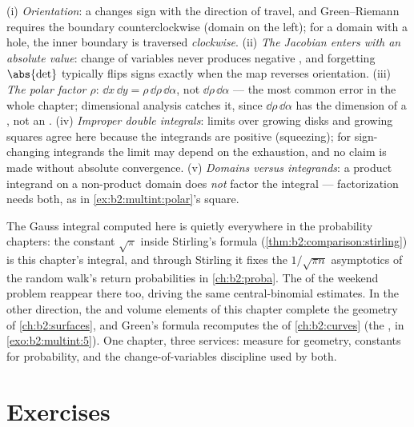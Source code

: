 \begin{remark}
(i) \emph{Orientation}: a  changes sign with the
direction of travel, and Green--Riemann requires the boundary
counterclockwise (domain on the left); for a domain with a
hole, the inner boundary is traversed \emph{clockwise}. (ii)
\emph{The Jacobian enters with an absolute value}: change of
variables never produces negative , and forgetting
$\abs{\det}$ typically flips signs exactly when the map
reverses orientation. (iii) \emph{The polar factor $\rho$}:
$\dd x\,\dd y = \rho\,\dd\rho\,\dd\alpha$, not
$\dd\rho\,\dd\alpha$ --- the most common error in the whole
chapter; dimensional analysis catches it, since
$\dd\rho\,\dd\alpha$ has the dimension of a , not an
. (iv) \emph{Improper double integrals}: limits over
growing disks and growing squares agree here because the
integrands are positive (squeezing); for sign-changing
integrands the limit may depend on the exhaustion, and no
claim is made without absolute convergence. (v)
\emph{Domains versus integrands}: a product integrand on a
non-product domain does \emph{not} factor the integral ---
factorization needs both, as in \cref{ex:b2:multint:polar}'s
square.
\end{remark}

\begin{remark}
The Gauss integral computed here is quietly everywhere in
the probability chapters: the constant $\sqrt\pi$ inside
Stirling's formula (\cref{thm:b2:comparison:stirling}) is
this chapter's integral, and through Stirling it fixes the
$1/\sqrt{\pi n}$ asymptotics of the random walk's return
probabilities in \cref{ch:b2:proba}. The  of
the weekend problem reappear there too, driving the same
central-binomial estimates. In the other direction, the 
and volume elements of this chapter complete the geometry of
\cref{ch:b2:surfaces}, and Green's formula recomputes the
  of \cref{ch:b2:curves} (the , in
\cref{exo:b2:multint:5}). One chapter, three services:
measure for geometry, constants for probability, and the
change-of-variables discipline used by both.
\end{remark}

\section{Exercises}

